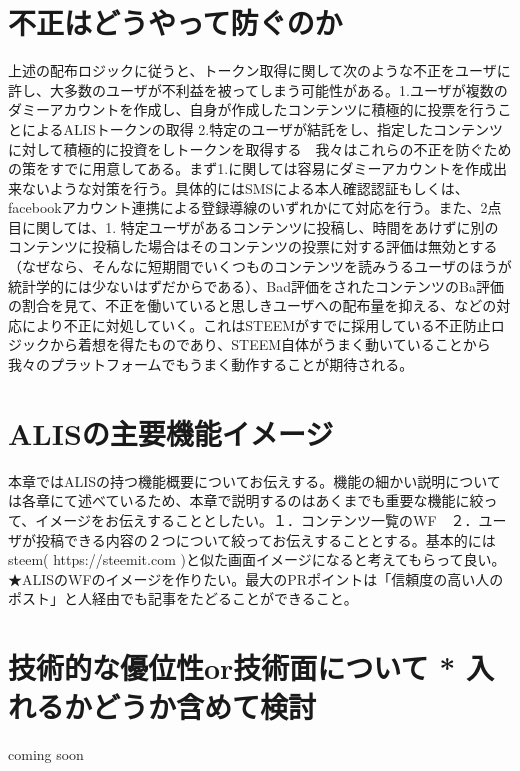 \documentclass{jsarticle}
\begin{document}
\section{不正はどうやって防ぐのか}
上述の配布ロジックに従うと、トークン取得に関して次のような不正をユーザに許し、大多数のユーザが不利益を被ってしまう可能性がある。1.ユーザが複数のダミーアカウントを作成し、自身が作成したコンテンツに積極的に投票を行うことによるALISトークンの取得 2.特定のユーザが結託をし、指定したコンテンツに対して積極的に投資をしトークンを取得する　我々はこれらの不正を防ぐための策をすでに用意してある。まず1.に関しては容易にダミーアカウントを作成出来ないような対策を行う。具体的にはSMSによる本人確認認証もしくは、facebookアカウント連携による登録導線のいずれかにて対応を行う。また、2点目に関しては、1. 特定ユーザがあるコンテンツに投稿し、時間をあけずに別のコンテンツに投稿した場合はそのコンテンツの投票に対する評価は無効とする（なぜなら、そんなに短期間でいくつものコンテンツを読みうるユーザのほうが統計学的には少ないはずだからである）、Bad評価をされたコンテンツのBa評価の割合を見て、不正を働いていると思しきユーザへの配布量を抑える、などの対応により不正に対処していく。これはSTEEMがすでに採用している不正防止ロジックから着想を得たものであり、STEEM自体がうまく動いていることから我々のプラットフォームでもうまく動作することが期待される。
\section{ALISの主要機能イメージ}
本章ではALISの持つ機能概要についてお伝えする。機能の細かい説明については各章にて述べているため、本章で説明するのはあくまでも重要な機能に絞って、イメージをお伝えすることとしたい。１．コンテンツ一覧のWF　２．ユーザが投稿できる内容の２つについて絞ってお伝えすることとする。基本的にはsteem( https://steemit.com )と似た画面イメージになると考えてもらって良い。★ALISのWFのイメージを作りたい。最大のPRポイントは「信頼度の高い人のポスト」と人経由でも記事をたどることができること。
\section{技術的な優位性or技術面について * 入れるかどうか含めて検討}
coming soon
\end{document}
